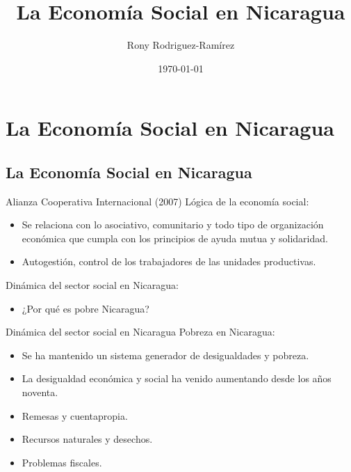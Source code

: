 \documentclass[11pt, aspectratio=169, compress]{beamer}
\title{La Economía Social en Nicaragua}
\author{Rony Rodriguez-Ramírez}
\institute{Economía Social y Humana | Grupo B018 \\Universidad Centroamericana}
\date{\today}
\begin{document}
	
\begin{frame}[plain]
	\maketitle  
\end{frame}

\section{La Economía Social en Nicaragua}
\subsection{La Economía Social en Nicaragua}
\begin{frame}{Alianza Cooperativa Internacional (2007)}
Lógica de la economía social: 

\begin{itemize}
	\item Se relaciona con lo asociativo, comunitario y todo tipo de organización económica que cumpla con los principios de ayuda mutua y solidaridad. 
	\item Autogestión, control de los trabajadores de las unidades productivas. 
\end{itemize}

Dinámica del sector social en Nicaragua:
\begin{itemize}
	\item ¿Por qué es pobre Nicaragua? 
\end{itemize}

\end{frame}
\begin{frame}{Dinámica del sector social en Nicaragua}
	Pobreza en Nicaragua:
	\begin{itemize}
		\item Se ha mantenido un sistema generador de desigualdades y pobreza.
		\item La desigualdad económica y social ha venido aumentando desde los años noventa.
		\item Remesas y cuentapropia. 
		\item Recursos naturales y desechos. 
		\item Problemas fiscales.
	\end{itemize}
\end{frame}
\end{document}
